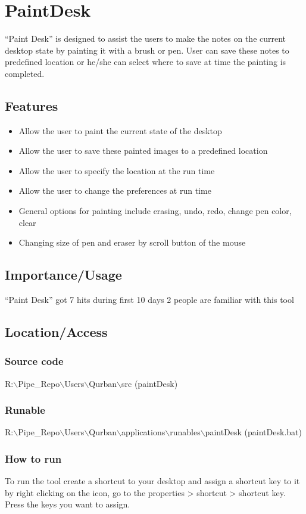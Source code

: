 \section{PaintDesk}

“Paint Desk” is designed to assist the users to make the notes on the current
desktop state by painting it with a brush or pen. User can save these notes to
predefined location or he/she can select where to save at time the painting is
completed.

\subsection*{Features}
\begin{itemize}
\item Allow the user to paint the current state of the desktop
\item Allow the user to save these painted images to a predefined location
\item Allow the user to specify the location at the run time
\item Allow the user to change the preferences at run time
\item General options for painting include erasing, undo, redo, change pen color, clear
\item Changing size of pen and eraser by scroll button of the mouse
\end{itemize}

\subsection*{Importance/Usage}

“Paint Desk” got 7 hits during first 10 days
2 people are familiar with this tool

\subsection*{Location/Access}
\subsubsection*{Source code}

R:$\backslash$Pipe\_Repo$\backslash$Users$\backslash$Qurban$\backslash$src (paintDesk)

\subsubsection*{Runable} 

R:$\backslash$Pipe\_Repo$\backslash$Users$\backslash$Qurban$\backslash$applications$\backslash$runables$\backslash$paintDesk (paintDesk.bat)

\subsubsection*{How to run} 

To run the tool create a shortcut to your desktop and assign a shortcut key to
it by right clicking on the icon, go to the properties > shortcut > shortcut
key. Press the keys you want to assign.

